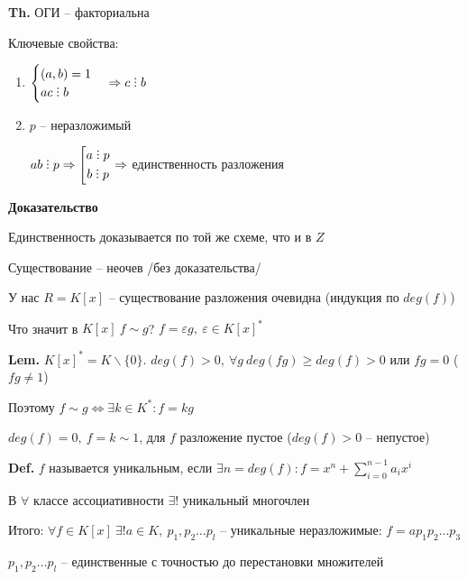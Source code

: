\documentclass[14pt, letter paper]{article}
\def\divby{%
  \mathrel{\text{\vbox{\baselineskip.65ex\lineskiplimit0pt\hbox{.}\hbox{.}\hbox{.}}}}%
}
\begin{document}
\textbf{Th.} ОГИ -- факториальна

Ключевые свойства:

\begin{enumerate}
    \item $\begin{cases}
        (a, b) = 1 \\
        ac \divby b
    \end{cases} \Rightarrow c \divby b$
    \item $p$ -- неразложимый
    
    $ab \divby p \Rightarrow \left[ \begin{gathered}
        a \divby p \\
        b \divby p
    \end{gathered} \right. \Rightarrow$ единственность разложения
\end{enumerate}

\begin{center}
    \textbf{Доказательство}
\end{center}

Единственность доказывается по той же схеме, что и в $Z$

Существование -- неочев /без доказательства/

У нас $R = K[x]$ -- существование разложения очевидна (индукция по $deg(f)$) 

\vspace{5mm}

Что значит в $K[x]\ f \sim g$? $f = \varepsilon g,\ \varepsilon \in K[x]^*$

\textbf{Lem.} $K[x]^* = K\backslash\{0\}$. $deg(f) > 0,\ \forall g\ deg(fg) \geq deg(f) > 0$ или $fg = 0$ ($fg \neq 1$)

Поэтому $f \sim g \Leftrightarrow \exists k \in K^* : f = kg$

$deg(f) = 0,\ f = k \sim 1$, для $f$ разложение пустое ($deg(f) > 0$ -- непустое)

\vspace{5mm}

\textbf{Def.} $f$ называется уникальным, если $\exists n = deg(f) : f = x^n + \sum\limits_{i = 0}^{n-1} a_ix^i$

В $\forall$ классе ассоциативности $\exists!$ уникальный многочлен

Итого: $\forall f \in K[x]\ \exists! a \in K,\ p_1, p_2 \ldots p_l$ -- уникальные неразложимые: $f = a p_1 p_2 \ldots p_3$

$p_1, p_2 \ldots p_l$ -- единственные с точностью до перестановки множителей
\end{document}
